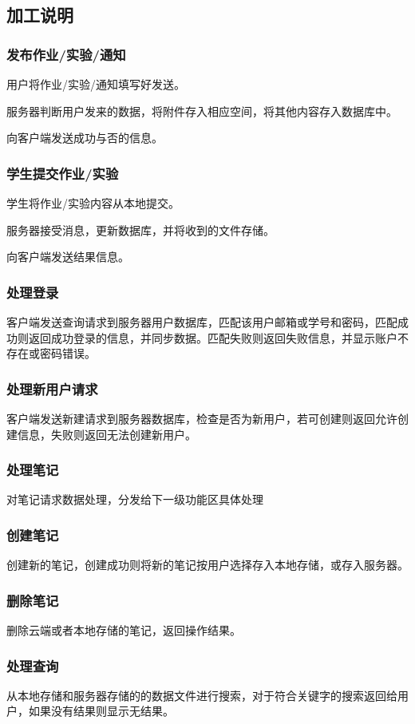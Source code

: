 \subsection{加工说明}
\subsubsection{发布作业/实验/通知}
用户将作业/实验/通知填写好发送。

服务器判断用户发来的数据，将附件存入相应空间，将其他内容存入数据库中。

向客户端发送成功与否的信息。

\subsubsection{学生提交作业/实验}
学生将作业/实验内容从本地提交。

服务器接受消息，更新数据库，并将收到的文件存储。

向客户端发送结果信息。

\subsubsection{处理登录}
客户端发送查询请求到服务器用户数据库，匹配该用户邮箱或学号和密码，匹配成功则返回成功登录的信息，并同步数据。匹配失败则返回失败信息，并显示账户不存在或密码错误。

\subsubsection{处理新用户请求}
客户端发送新建请求到服务器数据库，检查是否为新用户，若可创建则返回允许创建信息，失败则返回无法创建新用户。

\subsubsection{处理笔记}
对笔记请求数据处理，分发给下一级功能区具体处理

\subsubsection{创建笔记}
创建新的笔记，创建成功则将新的笔记按用户选择存入本地存储，或存入服务器。

\subsubsection{删除笔记}
删除云端或者本地存储的笔记，返回操作结果。

\subsubsection{处理查询}
从本地存储和服务器存储的的数据文件进行搜索，对于符合关键字的搜索返回给用户，如果没有结果则显示无结果。
